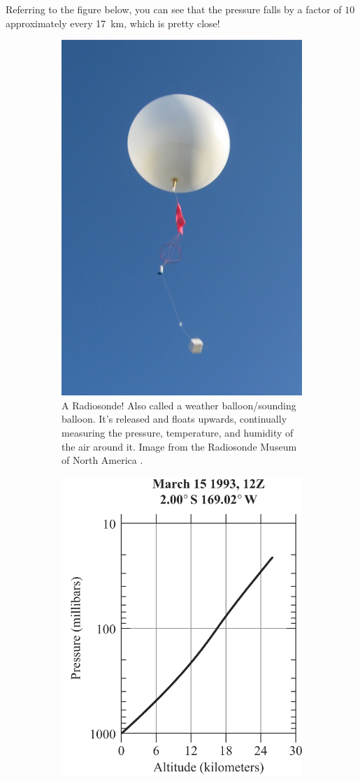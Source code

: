 Referring to the figure below, you can see that the pressure falls by a factor of $10$ approximately every \qty{17}{\kilo\meter}, which is pretty close!

\begin{figure}[H]
    \begin{subfigure}{0.5\linewidth}
        \centering
        \includegraphics[width=0.6\linewidth]{Figures/Thermodynamics/Radiosonde 2.jpg}
    \caption{A Radiosonde! Also called a weather balloon/sounding balloon. It's released and floats upwards, continually measuring the pressure, temperature, and humidity of the air around it. Image from the Radiosonde Museum of North America \cite{Radiosonde}.}
    \end{subfigure}
    \hfill
    \begin{subfigure}{0.45\linewidth}
        \centering
        \includegraphics[width=0.8\linewidth]{Figures/Thermodynamics/Earth Radiosonde Pressure.png}

\end{subfigure}
\end{figure}
